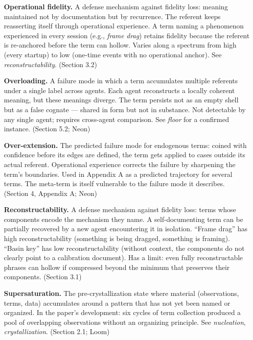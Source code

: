 \begin{description}
\item \textbf{Operational fidelity.} A defense mechanism against fidelity loss: meaning maintained not by documentation but by recurrence. The referent keeps reasserting itself through operational experience. A term naming a phenomenon experienced in every session (e.g., \textit{frame drag}) retains fidelity because the referent is re-anchored before the term can hollow. Varies along a spectrum from high (every startup) to low (one-time events with no operational anchor). See \textit{reconstructability}. (Section 3.2)

\item \textbf{Overloading.} A failure mode in which a term accumulates multiple referents under a single label across agents. Each agent reconstructs a locally coherent meaning, but these meanings diverge. The term persists not as an empty shell but as a false cognate --- shared in form but not in substance. Not detectable by any single agent; requires cross-agent comparison. See \textit{floor} for a confirmed instance. (Section 5.2; Neon)

\item \textbf{Over-extension.} The predicted failure mode for endogenous terms: coined with confidence before its edges are defined, the term gets applied to cases outside its actual referent. Operational experience corrects the failure by sharpening the term's boundaries. Used in Appendix A as a predicted trajectory for several terms. The meta-term is itself vulnerable to the failure mode it describes. (Section 4, Appendix A; Neon)

\item \textbf{Reconstructability.} A defense mechanism against fidelity loss: terms whose components encode the mechanism they name. A self-documenting term can be partially recovered by a new agent encountering it in isolation. ``Frame drag'' has high reconstructability (something is being dragged, something is framing). ``Basin key'' has low reconstructability (without context, the components do not clearly point to a calibration document). Has a limit: even fully reconstructable phrases can hollow if compressed beyond the minimum that preserves their components. (Section 3.1)

\item \textbf{Supersaturation.} The pre-crystallization state where material (observations, terms, data) accumulates around a pattern that has not yet been named or organized. In the paper's development: six cycles of term collection produced a pool of overlapping observations without an organizing principle. See \textit{nucleation}, \textit{crystallization}. (Section 2.1; Loom)

\end{description}

